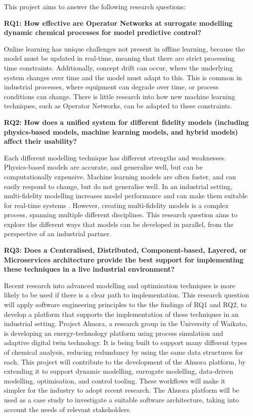 \documentclass[12pt]{article}
\begin{document}
This project aims to answer the following research questions:

\textbf{RQ1: How effective are Operator Networks at surrogate modelling dynamic chemical processes for model predictive control?}

Online learning has unique challenges not present in offline learning, because the model must be updated in real-time, meaning that there are strict processing time constraints. Additionally, concept drift can occur, where the underlying system changes over time and the model must adapt to this. This is common in industrial processes, where equipment can degrade over time, or process conditions can change. There is little research into how new machine learning techniques, such as Operator Networks, can be adapted to these constraints.

\textbf{RQ2: How does a unified system for different fidelity models (including physics-based models, machine learning models, and hybrid models) affect their usability?} 

Each different modelling technique has different strengths and weaknesses. Physics-based models are accurate, and generalise well, but can be computationally expensive. Machine learning models are often faster, and can easily respond to change, but do not generalise well. In an industrial setting, multi-fidelity modelling increases model performance and can make them suitable for real-time systems \cite{cao2021simulation}. However, creating multi-fidelity models is a complex process, spanning multiple different disciplines. This research question aims to explore the different ways that models can be developed in parallel, from the perspective of an industrial partner.


\textbf{RQ3: Does a Centeralised, Distributed, Component-based, Layered, or Microservices architecture provide the best support for implementing these techniques in a live industrial environment?}

Recent research into advanced modelling and optimisation techniques is more likely to be used if there is a clear path to implementation. This research question will apply software engineering principles to the the findings of RQ1 and RQ2, to develop a platform that supports the implementation of these techniques in an industrial setting. Project Ahuora, a research group in the University of Waikato, is developing an energy-technology platform using process simulation and adaptive digital twin technology. It is being built to support many different types of chemical analysis, reducing redundancy by using the same data structures for each. This project will contribute to the development of the Ahuora platform, by extending it to support dynamic modelling, surrogate modelling, data-driven modelling, optimisation, and control tooling. These workflows will make it simpler for the industry to adopt recent research. The Ahuora platform will be used as a case study to investigate a suitable software architecture, taking into account the needs of relevant stakeholders.
\end{document}

